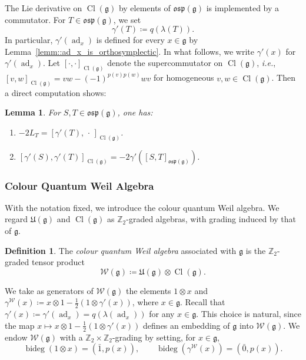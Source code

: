 \documentclass[11pt]{amsart}
\newcommand{\ad}{\operatorname{ad}}
\def\WW{{\mathcal{W}}}
\def\Weil{{\mathcal{W}(\gg)}}
\def\bideg{{\operatorname{bideg}}}
\def\Cl{{\operatorname{Cl}}}
\def\osp{{\mathfrak{osp}}}
\def\gg{{\mathfrak{g}}}
\def\ZZ{{\mathbb Z}}
\theoremstyle{plain}
\newtheorem{lemma}[theorem]{Lemma}
\theoremstyle{remark}
\theoremstyle{definition}
\newtheorem{definition}[theorem]{Definition}
\numberwithin{equation}{section}
\theoremstyle{remark}
\begin{document}
The Lie derivative on $\Cl(\gg)$ by elements of $\osp(\gg)$ is implemented by a commutator. For $T\in\osp(\gg)$, we set
\begin{equation}
\gamma'(T)\coloneqq q(\lambda(T)).
\end{equation}
In particular, $\gamma'(\ad_{x})$ is defined for every $x\in\gg$ by Lemma~\ref{lemm::ad_x_is_orthosymplectic}. In what follows, we write $\gamma'(x)$ for $\gamma'(\ad_{x})$. Let $[\cdot,\cdot]_{\Cl(\gg)}$ denote the supercommutator on $\Cl(\gg)$, \emph{i.e.},
$[v,w]_{\Cl(\gg)}=vw-(-1)^{p(v)p(w)}wv$ for homogeneous $v,w\in \Cl(\gg)$. Then a direct computation shows:

\begin{lemma}\label{lemm::Lie_derivative_as_commutator} For $S,T\in\osp(\gg)$, one has:
\begin{enumerate}
 \item[a)] $-2L_T=[\gamma'(T),\,\cdot\,]_{\Cl(\gg)}$.
 \item[b)] $[\gamma'(S),\gamma'(T)]_{\Cl(\gg)}=-2\gamma'([S,T]_{\osp(\gg)})$.
\end{enumerate}
\end{lemma}

\subsubsection{Colour Quantum Weil Algebra}
With the notation fixed, we introduce the colour quantum Weil algebra. We regard $\mathfrak{U}(\gg)$ and $\Cl(\gg)$ as $\ZZ_{2}$-graded algebras, with grading induced by that of $\gg$.

\begin{definition}
 The \emph{colour quantum Weil algebra} associated with $ \gg $ is the $\ZZ_{2}$-graded tensor product
\[
\mathcal{W}(\gg)\coloneqq \mathfrak{U}(\gg) \otimes \Cl(\gg).
\]
\end{definition}

We take as generators of $\Weil$ the elements $1\otimes x$ and $\gamma^{\WW}(x)\coloneqq x\otimes 1-\tfrac12(1\otimes\gamma'(x))$, where $x \in \gg$. Recall that $\gamma'(x)\coloneqq \gamma'(\ad_{x})=q(\lambda(\ad_{x}))$ for any $x \in \gg$. This choice is natural, since the map $x\mapsto x\otimes 1-\tfrac{1}{2}(1\otimes\gamma'(x))$ defines an embedding of $\gg$ into $\Weil$. We endow $\Weil$ with a $\ZZ_{2}\times\ZZ_{2}$-grading by setting, for $x\in\gg$,
\begin{equation} \label{def::bidegree}
\bideg(1\otimes x)=(\bar 1,p(x)),\qquad \bideg(\gamma^{\WW}(x))=(\bar 0,p(x)).
\end{equation}
\end{document}

